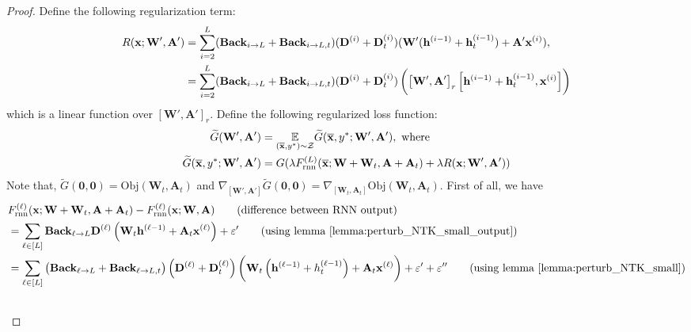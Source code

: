 \begin{proof}
	Define the following regularization term:
	\begin{align*}
		R(\mathbf{x}; \mathbf{W}', \mathbf{A}') &= \sum_{i = 2}^{L} (\mathbf{Back}_{i \to L} + \mathbf{Back}_{i \to L, t}) (\mathbf{D}^{(i)} + \mathbf{D}^{(i)}_t) (\mathbf{W}'(\mathbf{h}^{(i-1)} +  \mathbf{h}^{(i-1)}_t)  + \mathbf{A}' \mathbf{x}^{(i)}), \\&
		= \sum_{i = 2}^{L} (\mathbf{Back}_{i \to L} + \mathbf{Back}_{i \to L, t}) (\mathbf{D}^{(i)} + \mathbf{D}^{(i)}_t) \left(\left[\mathbf{W}', \mathbf{A}'\right]_r \left[\mathbf{h}^{(i-1)} +  \mathbf{h}^{(i-1)}_t, \mathbf{x}^{(i)}\right]\right)
	\end{align*}
	which is a linear function over $[\mathbf{W}', \mathbf{A}']_r$. Define the following regularized loss function:
	\begin{align*}
		\widetilde{G}(\mathbf{W}', \mathbf{A}') &= \underset{\left(\overline{\mathbf{x}}, y^{\ast}\right) \sim \mathcal{Z}}{\mathbb{E}} \widetilde{G}(\overline{\mathbf{x}}, y^{\ast};  \mathbf{W}',  \mathbf{A}'),\text{ where } \\ 
		\widetilde{G}(\overline{\mathbf{x}}, y^{\ast};  \mathbf{W}',  \mathbf{A}') &= G(\lambda F^{(L)}_{\mathrm{rnn}}(\overline{\mathbf{x}};  \mathbf{W} + \mathbf{W}_t,  \mathbf{A} + \mathbf{A}_t) + \lambda  R(\mathbf{x}; \mathbf{W}', \mathbf{A}'))
	\end{align*}
	Note that,
	$ \widetilde{G}(\mathbf{0}, \mathbf{0}) = \mathrm{Obj}(\mathbf{W}_t, \mathbf{A}_t)$ and $\nabla_{[\mathbf{W}', \mathbf{A}']} \widetilde{G}(\mathbf{0}, \mathbf{0}) = \nabla_{[\mathbf{W}_t, \mathbf{A}_t]} \mathrm{Obj}(\mathbf{W}_t, \mathbf{A}_t)$. First of all, %
	we have
	\begin{align*}
		&F^{(\ell)}_{\mathrm{rnn}}(\bx;  \mathbf{W} + \mathbf{W}_t,  \mathbf{A} + \mathbf{A}_t) - F^{(\ell)}_{\mathrm{rnn}}(\bx;  \mathbf{W},  \mathbf{A}) \tag{difference between RNN output}\\&=  \sum_{\ell \in [L]} \mathbf{Back}_{\ell \rightarrow L}  \mathbf{D}^{(\ell)} \left(\mathbf{W}_t \mathbf{h}^{(\ell-1)} + \mathbf{A}_t \mathbf{x}^{(\ell)} \right) + \varepsilon' \tag{using lemma~\ref{lemma:perturb_NTK_small_output}}\\&
		= \sum_{\ell \in [L]}\left(\mathbf{Back}_{\ell \rightarrow L}+\mathbf{Back}_{\ell \rightarrow L, t}\right)\left(\mathbf{D}^{(\ell)}+\mathbf{D}^{(\ell)}_t\right) \left(\mathbf{W}_t\left(\mathbf{h}^{(\ell-1)}+h^{(\ell-1)}_t\right) + \mathbf{A}_t \mathbf{x}^{(\ell)} \right) + \varepsilon' + \varepsilon'' \tag{using lemma~\ref{lemma:perturb_NTK_small}}\\&

\end{align*}
\end{proof}
